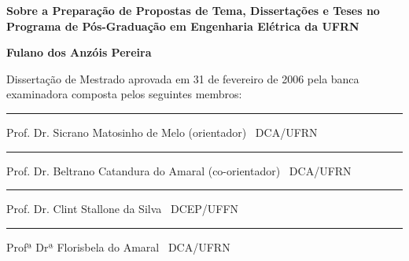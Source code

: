 %
%

\begin{titlepage}

\begin{center}

\LARGE

\textbf{Sobre a Preparação de Propostas de Tema, Dissertações
e Teses no Programa de Pós-Graduação em Engenharia Elétrica da UFRN}

\vfill

\Large

\textbf{Fulano dos Anzóis Pereira}

\end{center}

\vfill

\noindent
Dissertação de Mestrado
aprovada em 31 de fevereiro de 2006 pela banca examinadora composta
pelos seguintes membros:


\begin{center}

\vspace{1.5cm}\rule{0.95\linewidth}{1pt}
\parbox{0.9\linewidth}{%
Prof. Dr. Sicrano Matosinho de Melo (orientador) \dotfill\ DCA/UFRN}

\vspace{1.5cm}\rule{0.95\linewidth}{1pt}
\parbox{0.9\linewidth}{%
Prof. Dr. Beltrano Catandura do Amaral (co-orientador) \dotfill\ DCA/UFRN}

\vspace{1.5cm}\rule{0.95\linewidth}{1pt}
\parbox{0.9\linewidth}{%
Prof. Dr. Clint Stallone da Silva \dotfill\ DCEP/UFFN}

\vspace{1.5cm}\rule{0.95\linewidth}{1pt}
\parbox{0.9\linewidth}{%
Profª Drª Florisbela do Amaral \dotfill\ DCA/UFRN}

\end{center}

\end{titlepage}

